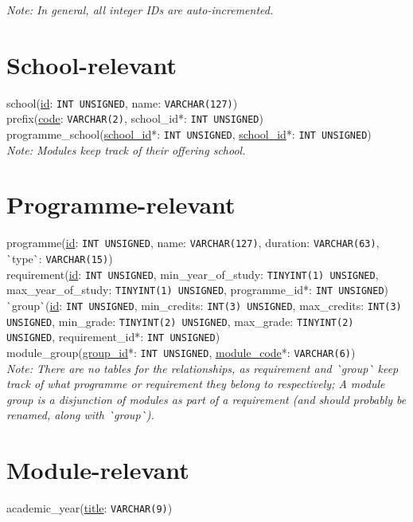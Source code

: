 \textit{Note: In general, all integer IDs are auto-incremented.}

\sffamily

\section{School-relevant}
school(\underline{id}: \texttt{INT UNSIGNED},
name: \texttt{VARCHAR(127)})
\\

prefix(\underline{code}: \texttt{VARCHAR(2)},
school\_id*: \texttt{INT UNSIGNED})
\\

programme\_school(\underline{school\_id}*: \texttt{INT UNSIGNED},
\underline{school\_id}*: \texttt{INT UNSIGNED})
\\

\textit{Note: Modules keep track of their offering school.}

\section{Programme-relevant}
programme(\underline{id}: \texttt{INT UNSIGNED},
name: \texttt{VARCHAR(127)},
duration: \texttt{VARCHAR(63)},
\`{}type\`{}: \texttt{VARCHAR(15)})
\\

requirement(\underline{id}: \texttt{INT UNSIGNED},
min\_year\_of\_study: \texttt{TINYINT(1) UNSIGNED},\\
max\_year\_of\_study: \texttt{TINYINT(1) UNSIGNED},
programme\_id*: \texttt{INT UNSIGNED})
\\

\`{}group\`{}(\underline{id}: \texttt{INT UNSIGNED},
min\_credits: \texttt{INT(3) UNSIGNED},
max\_credits: \texttt{INT(3) UNSIGNED},
min\_grade: \texttt{TINYINT(2) UNSIGNED},
max\_grade: \texttt{TINYINT(2) UNSIGNED},
requirement\_id*: \texttt{INT UNSIGNED})
\\

module\_group(\underline{group\_id}*: \texttt{INT UNSIGNED},
\underline{module\_code}*: \texttt{VARCHAR(6)})
\\

\textit{Note: There are no tables for the relationships, as requirement and
\`{}group\`{} keep track of what programme or requirement they belong to
respectively; A module group is a disjunction of modules as part of a
requirement (and should probably be renamed, along with \`{}group\`{}).}

\section{Module-relevant}
academic\_year(\underline{title}: \texttt{VARCHAR(9)})
\\

